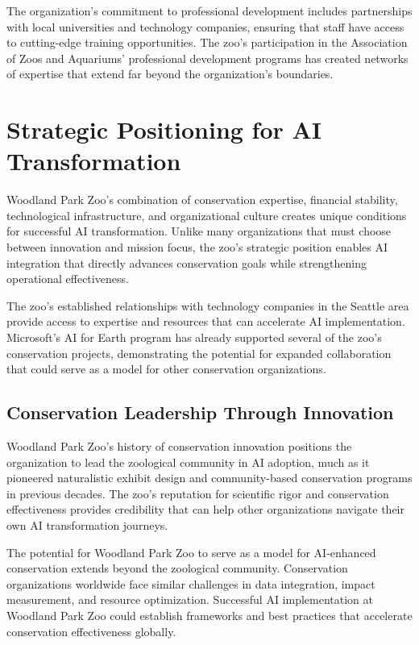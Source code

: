 \documentclass[
  Letterpaper,
]{scrbook}
\begin{document}
The organization's commitment to professional development includes
partnerships with local universities and technology companies, ensuring
that staff have access to cutting-edge training opportunities. The zoo's
participation in the Association of Zoos and Aquariums' professional
development programs has created networks of expertise that extend far
beyond the organization's boundaries.

\section{Strategic Positioning for AI
Transformation}\label{strategic-positioning-for-ai-transformation}

Woodland Park Zoo's combination of conservation expertise, financial
stability, technological infrastructure, and organizational culture
creates unique conditions for successful AI transformation. Unlike many
organizations that must choose between innovation and mission focus, the
zoo's strategic position enables AI integration that directly advances
conservation goals while strengthening operational effectiveness.

The zoo's established relationships with technology companies in the
Seattle area provide access to expertise and resources that can
accelerate AI implementation. Microsoft's AI for Earth program has
already supported several of the zoo's conservation projects,
demonstrating the potential for expanded collaboration that could serve
as a model for other conservation organizations.

\subsection{Conservation Leadership Through
Innovation}\label{conservation-leadership-through-innovation}

Woodland Park Zoo's history of conservation innovation positions the
organization to lead the zoological community in AI adoption, much as it
pioneered naturalistic exhibit design and community-based conservation
programs in previous decades. The zoo's reputation for scientific rigor
and conservation effectiveness provides credibility that can help other
organizations navigate their own AI transformation journeys.

The potential for Woodland Park Zoo to serve as a model for AI-enhanced
conservation extends beyond the zoological community. Conservation
organizations worldwide face similar challenges in data integration,
impact measurement, and resource optimization. Successful AI
implementation at Woodland Park Zoo could establish frameworks and best
practices that accelerate conservation effectiveness globally.
\end{document}
